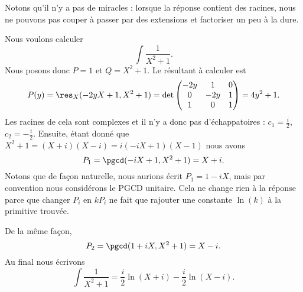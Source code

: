 Notons qu'il n'y a pas de miracles : lorsque la réponse contient des racines, nous ne pouvons pas couper à passer par des extensions et factoriser un peu à la dure.

\begin{example} \label{ExYQODuyU}
	Nous voulons calculer
	\begin{equation}
		\int\frac{ 1 }{ X^2+1 }.
	\end{equation}
	Nous posons donc \( P=1\) et \( Q=X^2+1\). Le résultant à calculer est
	\begin{subequations}
		\begin{align}
			P(y)=\res_X(-2yX+1,X^2+1)=\det\begin{pmatrix}
				-2y & 1   & 0 \\
				0   & -2y & 1 \\
				1   & 0   & 1
			\end{pmatrix}=4y^2+1.
		\end{align}
	\end{subequations}
	Les racines de cela sont complexes et il n'y a donc pas d'échappatoires : \( c_1=\frac{ i }{2}\), \( c_2=-\frac{ i }{2}\). Ensuite, étant donné que \( X^2+1=(X+i)(X-i)=i(-iX+1)(X-1)\) nous avons
	\begin{equation}
		P_1=\pgcd(-iX+1,X^2+1)=X+i.
	\end{equation}
	Notons que de façon naturelle, nous aurions écrit \( P_1=1-iX\), mais par convention nous considérons le PGCD unitaire. Cela ne change rien à la réponse parce que changer \( P_i\) en \( kP_i\) ne fait que rajouter une constante \( \ln(k)\) à la primitive trouvée.

	De la même façon,
	\begin{equation}
		P_2=\pgcd(1+iX,X^2+1)=X-i.
	\end{equation}
	Au final nous écrivons
	\begin{equation}
		\int\frac{1}{ X^2+1 }=\frac{ i }{2}\ln(X+i)-\frac{ i }{2}\ln(X-i).
	\end{equation}
\end{example}

